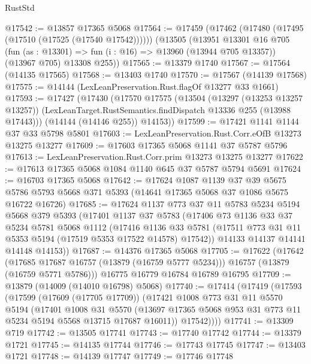 \begin{lexlean}{RustStd}
\begin{coremodule}
@17542 := @13857 @17365 @5068
@17564 := @17459
    (@17462 (@17480 (@17495 (@17510 (@17525 (@17540 @17542))))))
    (@13505
      (@13951
        @13301
        @16
        @705
        (fun (as : @13301) => fun (i : @16) => @13960 (@13944 @705 @13357))
        (@13967 @705)
        @13308
        @255))
@17565 := @13379 @1740
@17567 := @17564 (@14135 @17565)
@17568 := @13403 @1740
@17570 := @17567 (@14139 @17568)
@17575 := @14144 (LexLeanPreservation.Rust.flagOf @13277 @33 @1661)
@17593 := @17427
    (@17430
      (@17570
        @17575
        (@13504
          (@13297 (@13253 @13257 @13257))
          (LexLeanTarget.RustSemantics.findDispatch @13336 @255 (@13988 @17443)))
        (@14144 (@14146 @255))
        @14153))
@17599 := @17421 @1141 @1144 @37 @33 @5798 @5801
@17603 := LexLeanPreservation.Rust.Corr.eOfB @13273 @13275 @13277
@17609 := @17603 @17365 @5068 @1141 @37 @5787 @5796
@17613 := LexLeanPreservation.Rust.Corr.prim @13273 @13275 @13277
@17622 := @17613 @17365 @5068 @1084 @1140 @645 @37 @5787 @5794 @5691
@17624 := @16703 @17365 @5068
@17642 := @17624
    @1087
    @1139
    @37
    @39
    @5675
    @5786
    @5793
    @5668
    @371
    @5393
    (@14641 @17365 @5068 @37 @1086 @5675 @16722 @16726)
@17685 := @17624
    @1137
    @773
    @37
    @11
    @5783
    @5234
    @5194
    @5668
    @379
    @5393
    (@17401
      @1137
      @37
      @5783
      (@17406
        @73
        @1136
        @33
        @37
        @5234
        @5781
        @5068
        @1112
        (@17416
          @1136
          @33
          @5781
          (@17511 @773 @31 @11 @5353 @5194 (@17519 @5353 @17522 @14578) @17542))
        @14133
        @14137
        @14141
        @14148
        @14153))
@17687 := @14376 @17365 @5068
@17705 := @17622
    (@17642
      (@17685 @17687 @16757 (@13879 (@16759 @5777 @5234)))
      @16757
      (@13879 (@16759 @5771 @5786)))
    @16775
    @16779
    @16784
    @16789
    @16795
@17709 := @13879 (@14009 (@14010 @16798) @5068)
@17740 := @17414
    (@17419
      (@17593
        (@17599
          (@17609 (@17705 @17709))
          (@17421
            @1008
            @773
            @31
            @11
            @5570
            @5194
            (@17401
              @1008
              @31
              @5570
              (@13697 @17365 @5068 @953 @31 @773 @11 @5234 @5194 @5568 @13715 @17687 @16011))
            @17542))))
@17741 := @13309 @719
@17742 := @13505 @17741
@17743 := @17740 @17742
@17744 := @13379 @1721
@17745 := @14135 @17744
@17746 := @17743 @17745
@17747 := @13403 @1721
@17748 := @14139 @17747
@17749 := @17746 @17748

\end{coremodule}
\end{lexlean}
